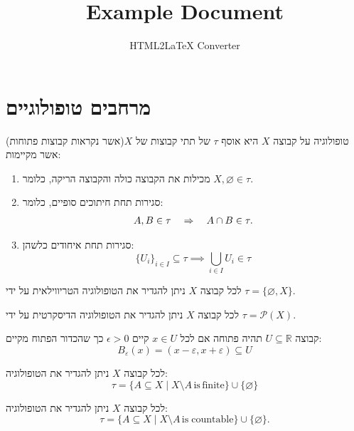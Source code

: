 \documentclass{tstextbook}
\begin{document}
\title{Example Document}
\author{HTML2LaTeX Converter}
\maketitle


\section{מרחבים טופולוגיים}

\begin{definition}[טופולוגיה]
טופולוגיה על קבוצה \(X\) היא אוסף \(\tau\) של תתי קבוצות של \(X\)(אשר נקראות קבוצות פתוחות) אשר מקיימות:

  \begin{enumerate}
    \item מכילות את הקבוצה כולה והקבוצה הריקה, כלומר \(X,\varnothing  \in \tau\). 


    \item סגירות תחת חיתוכים סופיים, כלומר: 
$$\begin{array}{r l}{A,B\in\tau}&{{}\Rightarrow\quad A\cap B\in\tau.}\end{array}$$


    \item סגירות תחת איחודים כלשהן: 
$$\{U_{i}\}_{i\in I}\subseteq\tau\implies\bigcup_{i\in I}U_{i}\in\tau$$


  \end{enumerate}
\end{definition}
\begin{example}
לכל קבוצה \(X\) ניתן להגדיר את הטופולוגיה הטריווילאית על ידי \(\tau=\{ \varnothing,X \}\).

\end{example}
\begin{example}
לכל קבוצה \(X\) ניתן להגדיר את הטופולוגיה הדיסקרטית על ידי \(\tau=\mathcal{P}(X)\).

\end{example}
\begin{example}
קבוצה \(U\subseteq \mathbb{R}\) תהיה פתוחה אם לכל \(x \in U\) קיים \(\epsilon>0\) כך שהכדור הפתוח מקיים:
$$B_{\varepsilon}(x)=(x-\varepsilon,x+\varepsilon)\subseteq U$$

\end{example}
\begin{example}
לכל קבוצה \(X\) ניתן להגדיר את הטופולוגיה:
$$\tau=\{A\subseteq X\mid X\setminus A\,\mathrm{is\,finite}\}\cup\{\varnothing \}$$

\end{example}
\begin{example}
לכל קבוצה \(X\) ניתן להגדיר את הטופולוגיה:
$$\tau=\{A\subseteq X\mid X\setminus A\,\mathrm{is\;countable}\}\cup\{\varnothing \}.$$

\end{example}
\end{document}
